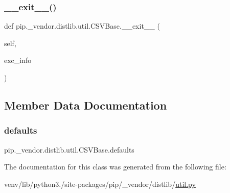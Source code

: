 \subsubsection{\texorpdfstring{\+\_\+\+\_\+exit\+\_\+\+\_\+()}{\_\_exit\_\_()}}
{\footnotesize\ttfamily def pip.\+\_\+vendor.\+distlib.\+util.\+C\+S\+V\+Base.\+\_\+\+\_\+exit\+\_\+\+\_\+ (\begin{DoxyParamCaption}\item[{}]{self,  }\item[{}]{exc\+\_\+info }\end{DoxyParamCaption})}



\subsection{Member Data Documentation}
\mbox{\label{classpip_1_1__vendor_1_1distlib_1_1util_1_1CSVBase_adb629c8c813b8b0884a9b1dbdb5ab085}} 
\subsubsection{\texorpdfstring{defaults}{defaults}}
{\footnotesize\ttfamily pip.\+\_\+vendor.\+distlib.\+util.\+C\+S\+V\+Base.\+defaults\hspace{0.3cm}{\ttfamily [static]}}



The documentation for this class was generated from the following file\+:\begin{DoxyCompactItemize}
\item 
venv/lib/python3./site-\/packages/pip/\+\_\+vendor/distlib/\hyperlink{pip_2__vendor_2distlib_2util_8py}{util.\+py}\end{DoxyCompactItemize}
